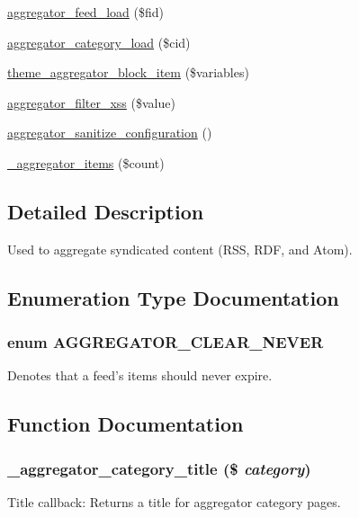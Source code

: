 \begin{DoxyCompactItemize}
\hyperlink{aggregator_8module_a75d55b29c2e341452a7f4ff981f58b08}{aggregator\_\-feed\_\-load} (\$fid)
\item 
\hyperlink{aggregator_8module_a21068362472c355d68eeeb37de326d91}{aggregator\_\-category\_\-load} (\$cid)
\item 
\hyperlink{group__themeable_ga311e62f08cc510fe7e50477485f54943}{theme\_\-aggregator\_\-block\_\-item} (\$variables)
\item 
\hyperlink{aggregator_8module_aeae59ae915eb52b6750932dabfbdf236}{aggregator\_\-filter\_\-xss} (\$value)
\item 
\hyperlink{aggregator_8module_af954c80a39d72d63c2f87037351f9d8b}{aggregator\_\-sanitize\_\-configuration} ()
\item 
\hyperlink{aggregator_8module_a9d50c74bac5811ef2e76face50ea9031}{\_\-aggregator\_\-items} (\$count)
\end{DoxyCompactItemize}


\subsection{Detailed Description}
Used to aggregate syndicated content (RSS, RDF, and Atom). 

\subsection{Enumeration Type Documentation}
\hypertarget{aggregator_8module_a623ff7ad38eb829496a7e02a06fae000}{
\subsubsection[{AGGREGATOR\_\-CLEAR\_\-NEVER}]{\setlength{\rightskip}{0pt plus 5cm}enum {\bf AGGREGATOR\_\-CLEAR\_\-NEVER}}}
\label{aggregator_8module_a623ff7ad38eb829496a7e02a06fae000}
Denotes that a feed's items should never expire. 

\subsection{Function Documentation}
\hypertarget{aggregator_8module_aafaeff2e2b30da641b78b2cac450d8b3}{
\subsubsection[{\_\-aggregator\_\-category\_\-title}]{\setlength{\rightskip}{0pt plus 5cm}\_\-aggregator\_\-category\_\-title (\$ {\em category})}}
\label{aggregator_8module_aafaeff2e2b30da641b78b2cac450d8b3}
Title callback: Returns a title for aggregator category pages.


